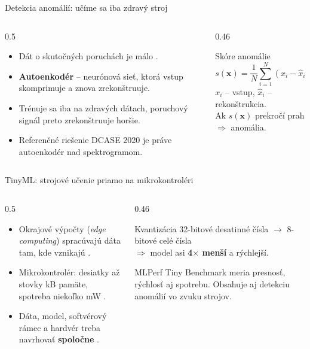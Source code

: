 \documentclass[aspectratio=169,11pt]{beamer}
\begin{document}
\begin{frame}{Detekcia anomálií: učíme sa iba zdravý stroj}
  \begin{columns}[c]
    \begin{column}{0.5\textwidth}
      \begin{itemize}
        \item Dát o skutočných poruchách je málo \cite{lei}.
        \item \textbf{Autoenkodér} -- neurónová sieť, ktorá vstup skomprimuje a znova zrekonštruuje.
        \item Trénuje sa iba na zdravých dátach, poruchový signál preto zrekonštruuje horšie.
        \item Referenčné riešenie DCASE 2020 \cite{dcase} je práve autoenkodér nad spektrogramom.
      \end{itemize}
    \end{column}
    \begin{column}{0.46\textwidth}
      \begin{block}{Skóre anomálie}
        \[
          s(\mathbf{x}) = \frac{1}{N}\sum_{i=1}^{N}\left(x_i-\hat{x}_i\right)^2
        \]
        \small $x_i$ -- vstup, $\hat{x}_i$ -- rekonštrukcia.\\
        Ak $s(\mathbf{x})$ prekročí prah $\Rightarrow$ \alert{anomália}.
      \end{block}
    \end{column}
  \end{columns}
\end{frame}

\begin{frame}{TinyML: strojové učenie priamo na mikrokontroléri}
  \begin{columns}[T]
    \begin{column}{0.5\textwidth}
      \begin{itemize}
        \item Okrajové výpočty (\emph{edge computing}) spracúvajú dáta tam, kde vznikajú \cite{shi}.
        \item Mikrokontrolér: desiatky až stovky kB pamäte, spotreba niekoľko mW \cite{njor}.
        \item Dáta, model, softvérový rámec a hardvér treba navrhovať \textbf{spoločne} \cite{njor}.
      \end{itemize}
    \end{column}
    \begin{column}{0.46\textwidth}
      \begin{block}{Kvantizácia \cite{jacob}}
        32-bitové desatinné čísla $\rightarrow$ 8-bitové celé čísla\\
        $\Rightarrow$ model asi \textbf{4$\times$ menší} a rýchlejší.
      \end{block}
      \begin{block}{MLPerf Tiny \cite{mlperf}}
        Benchmark meria presnosť, rýchlosť aj spotrebu. Obsahuje aj detekciu anomálií vo zvuku strojov.
      \end{block}
    \end{column}
  \end{columns}
\end{frame}
\end{document}
